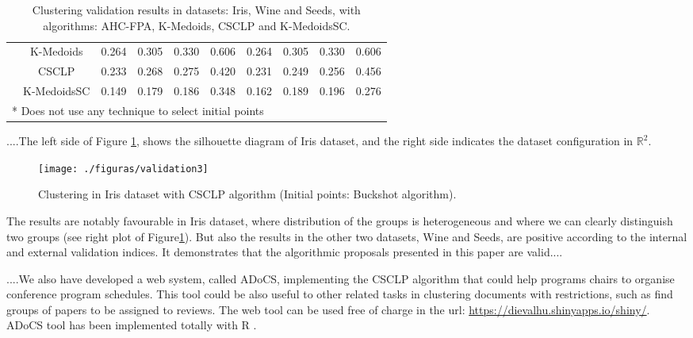 \documentclass[procedia]{easychair}
\begin{document}
\begin{table*}[]
{\begin{tabular}{cccccccccc}
                                   & {K-Medoids}                  & 0.264        & 0.305        & 0.330        & 0.606           & 0.264        & 0.305        & 0.330        & 0.606           \\ 
                                   & {CSCLP}                      & 0.233        & 0.268        & 0.275        & 0.420           & 0.231        & 0.249        & 0.256        & 0.456           \\ 
                                   & {K-MedoidsSC}                & 0.149        & 0.179        & 0.186        & 0.348           & 0.162        & 0.189        & 0.196        & 0.276           \\ \midrule
\multicolumn{10}{l}{* Does not use any technique to select initial points}                                                                                                                           \\ \bottomrule
\end{tabular}}
\caption{Clustering validation results in datasets: Iris, Wine and Seeds, with algorithms: AHC-FPA, K-Medoids, CSCLP and K-MedoidsSC.}
\label{tb:tab2}

\end{table*}


....The left side of Figure \ref{fig:validation3}, shows the silhouette diagram of Iris dataset, and the right side indicates the dataset configuration in $\mathbb{R}^{2}$.

\begin{figure}[htb]
\centering 
\texttt{[image: ./figuras/validation3]}
\caption{Clustering in Iris dataset with CSCLP algorithm (Initial points: Buckshot algorithm).} 
\label{fig:validation3}
\end{figure}

The results are notably favourable in Iris dataset, where distribution of the groups is heterogeneous and where we can clearly distinguish two groups \cite{Chavent:98} (see right plot of Figure\ref{fig:validation3}). But also the results in the other two datasets, Wine and Seeds, are positive according to the internal and external validation indices. It demonstrates that the algorithmic proposals presented in this paper are valid....

....We also have developed a web system, called ADoCS, implementing the CSCLP algorithm that could help programs chairs to organise conference program schedules. This tool could be also useful to other related tasks in clustering documents with restrictions, such as find groups of papers to be assigned to reviews. The web tool can be used free of charge in the url: \url{https://dievalhu.shinyapps.io/shiny/}. 
ADoCS tool has been implemented totally with R \cite{Rproy}.
\end{document}

